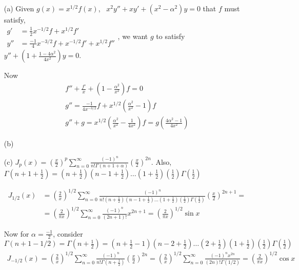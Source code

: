 \documentclass[twoside]{amsart}
\theoremstyle{plain}
\theoremstyle{definition}
\newcommand{\exercisehead}[1]
  {
   \noindent{\small\bf Exercise #1.}
   \smallskip}
\begin{document}
\exercisehead{1} \begin{itemize}
\item[(a)] Given $g(x) = x^{1/2} f(x)$, \, $x^2 y'' + xy' + (x^2 - \alpha^2)y=0$ that $f$ must satisfy, \\
$\begin{aligned} g' & = \frac{1}{2} x^{-1/2} f + x^{1/2} f' \\ y'' & = \frac{-1}{4} x^{-3/2} f + x^{-1/2} f' + x^{1/2} f'' \end{aligned}$, we want $g$ to satisfy $y'' + \left( 1 + \frac{1- 4 \alpha^2}{4x^2} \right) y =0$.  

Now 
\[
\begin{gathered}
  f'' + \frac{f'}{x} + \left( 1 - \frac{\alpha^2}{x^2} \right) f = 0 \\
  g'' = \frac{-1}{4x^{-3/2}} f + x^{1/2} \left( \frac{ \alpha^2}{x^2} - 1 \right) f \\
    g'' + g = x^{1/2} \left( \frac{\alpha^2}{x^2} - \frac{1}{4 x^2} \right) f = g \left( \frac{4\alpha^2 - 1 }{ 4 x^2} \right)
\end{gathered}
\]
\item[(b)]
\item[(c)] $J_p(x) = \left( \frac{x}{2} \right)^p \sum_{n=0}^{\infty} \frac{(-1)^n}{n! \Gamma(n+1+\alpha) } \left( \frac{x}{2} \right)^{2n}$.  Also, \\
$\Gamma\left( n+1 + \frac{1}{2} \right) = \left( n+\frac{1}{2}\right)\left( n-1 + \frac{1}{2} \right) \dots \left( 1+ \frac{1}{2} \right) \left( \frac{1}{2} \right) \Gamma\left( \frac{1}{2} \right)$

\[
\begin{aligned}
  J_{1/2}(x) & = \left( \frac{2}{x} \right)^{1/2} \sum_{n=0}^{\infty} \frac{(-1)^n }{ n! (n+\frac{1}{2}) (n-1 + \frac{1}{2} )\dots ( 1 + \frac{1}{2} )( \frac{1}{2} ) \Gamma\left( \frac{1}{2} \right) } \left( \frac{x}{2} \right)^{2n+1} = \\
  & = \left( \frac{2}{\pi x} \right)^{1/2} \sum_{n=0}^{\infty} \frac{ (-1)^n }{ (2n+1)!}x^{2n+1} = \left( \frac{2}{\pi x} \right)^{1/2} \sin{x}
\end{aligned}
\]

Now for $\alpha = \frac{-1}{2}$, consider \\
$\Gamma(n+1 - 1/2) = \Gamma\left( n+\frac{1}{2} \right) = \left( n + \frac{1}{2} - 1 \right) \left( n -2 + \frac{1}{2} \right) \dots \left( 2 + \frac{1}{2} \right) \left( 1 + \frac{1}{2} \right) \left( \frac{1}{2} \right) \Gamma\left( \frac{1}{2} \right)$
\[
\begin{aligned}
  J_{-1/2}(x) = \left( \frac{2}{x} \right)^{1/2} \sum_{n=0}^{\infty} \frac{(-1)^n }{ n! \Gamma\left( n + \frac{1}{2} \right) } \left( \frac{x}{2} \right)^{2n} = \left( \frac{2}{x} \right)^{1/2} \sum_{n=0}^{\infty} \frac{ (-1)^n  x^{2n} }{ (2n)! \Gamma(1/2)} = \left( \frac{2}{\pi x} \right)^{1/2} \cos{x}
\end{aligned}
\]
\end{itemize}
\end{document}
